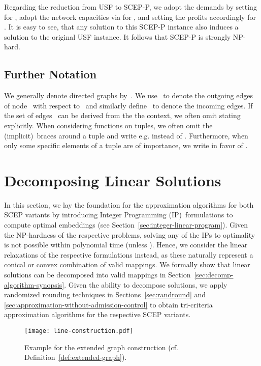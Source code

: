 \documentclass[10pt, conference, letterpaper]{IEEEtran}
\begin{document}
Regarding the reduction from USF to SCEP-P, we adopt the demands by setting  for , adopt the network capacities via  for , and setting the profits accordingly  for . It is easy to see, that any solution to this SCEP-P instance also induces a solution to the original USF instance. It follows that SCEP-P is strongly NP-hard. 


\subsection{Further Notation}

We generally denote directed graphs by~. We use~ to denote the outgoing edges of node~ with respect to~ and similarly define~ to denote the incoming edges. If the set of 
edges~ can be derived from the the context, we often omit stating~ explicitly.
When considering functions on tuples, we often omit the (implicit)~braces around a tuple and write e.g.  instead of .
Furthermore, when only some specific elements of a tuple are of importance, we write  in favor of .

\section{Decomposing Linear Solutions}\label{sec:decompo}

In this section, we lay the foundation for the approximation algorithms for both SCEP variants by introducing Integer Programming (IP)~formulations to compute optimal embeddings (see Section~\ref{sec:integer-linear-program}). Given the NP-hardness of the respective problems, solving any of the IPs to optimality is not possible within polynomial time (unless ). Hence, we consider the linear relaxations of the respective formulations instead, as these naturally represent a conical or convex combination of valid mappings.  We formally show that linear solutions can be decomposed into valid mappings in Section~\ref{sec:decomp-algorithm-synopsis}. Given the ability to decompose solutions, we apply randomized rounding techniques in Sections~\ref{sec:randround} and \ref{sec:approximation-without-admission-control} to obtain tri-criteria approximation algorithms for the respective SCEP variants.

\begin{figure}[t!]
\texttt{[image: line-construction.pdf]}
\caption{Example for the extended graph construction (cf. Definition~\ref{def:extended-graph}).}
\label{fig:extended-graph-linear}
\end{figure}
\end{document}
